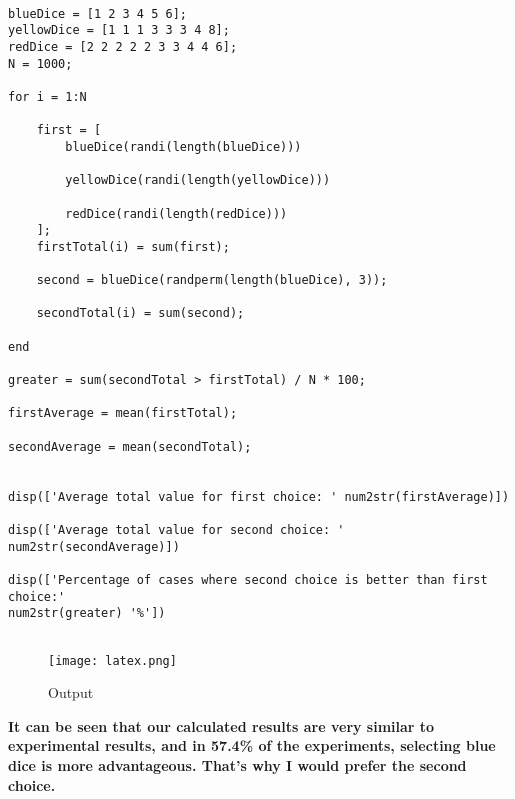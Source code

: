\documentclass[12pt]{article}
\begin{document}
\begin{lstlisting}

blueDice = [1 2 3 4 5 6];
yellowDice = [1 1 1 3 3 3 4 8];
redDice = [2 2 2 2 2 3 3 4 4 6];
N = 1000;

for i = 1:N

    first = [
        blueDice(randi(length(blueDice))) 
        
        yellowDice(randi(length(yellowDice)))
        
        redDice(randi(length(redDice)))
    ];
    firstTotal(i) = sum(first);

    second = blueDice(randperm(length(blueDice), 3));
    
    secondTotal(i) = sum(second);
    
end

greater = sum(secondTotal > firstTotal) / N * 100;

firstAverage = mean(firstTotal);

secondAverage = mean(secondTotal);


disp(['Average total value for first choice: ' num2str(firstAverage)])

disp(['Average total value for second choice: ' num2str(secondAverage)])

disp(['Percentage of cases where second choice is better than first choice:' 
num2str(greater) '%'])


\end{lstlisting}

\begin{figure}[h]
    \centering
    \texttt{[image: latex.png]}
    \caption{Output}
    \label{fig:image}
\end{figure}


\textbf{
        It can be seen that our calculated results are very similar to experimental results, and in 57.4\% of the experiments, selecting blue dice is more advantageous. That's why I would prefer the second choice.
    }
\end{document}
